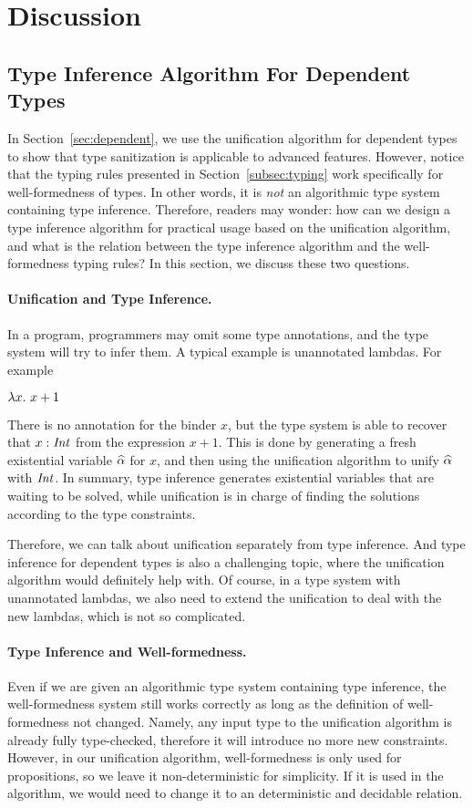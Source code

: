 \section{Discussion}

\subsection{Type Inference Algorithm For Dependent Types}

In Section~\ref{sec:dependent}, we use the unification algorithm for dependent types
to show that type sanitization is applicable to advanced features. However,
notice that the typing rules presented in Section~\ref{subsec:typing} work
specifically for well-formedness of types. In other words, it is \textit{not} an
algorithmic type system containing type inference. Therefore, readers may wonder:
how can we design a type inference algorithm for practical usage based on the
unification algorithm, and what is the relation between the type inference
algorithm and the well-formedness typing rules? In this section, we discuss
these two questions.

\paragraph{Unification and Type Inference.} In a program, programmers may omit
some type annotations, and the type system will try to infer them. A typical
example is unannotated lambdas. For example

$\lambda {x}.~ {x + 1} $

There is no annotation for the binder $x$, but the type system is able to
recover that $x:\mathit{Int}$ from the expression $x + 1$. This is done by generating a
fresh existential variable $\widehat{\alpha}$ for $x$, and then using the unification
algorithm to unify $\widehat{\alpha}$ with $\mathit{Int}$. In summary, type inference generates
existential variables that are waiting to be solved, while unification is in
charge of finding the solutions according to the type constraints.

Therefore, we can talk about unification separately from type inference. And
type inference for dependent types is also a challenging topic, where the
unification algorithm would definitely help with. Of course, in a type system
with unannotated lambdas, we also need to extend the unification to deal with
the new lambdas, which is not so complicated.

\paragraph{Type Inference and Well-formedness.} Even if we are given an
algorithmic type system containing type inference, the well-formedness system
still works correctly as long as the definition of well-formedness not changed.
Namely, any input type to the unification algorithm is already fully
type-checked, therefore it will introduce no more new constraints. However,
in our unification algorithm, well-formedness is only used for propositions,
so we leave it non-deterministic for simplicity. If it is used in the
algorithm, we would need to change it to an deterministic and decidable
relation.

